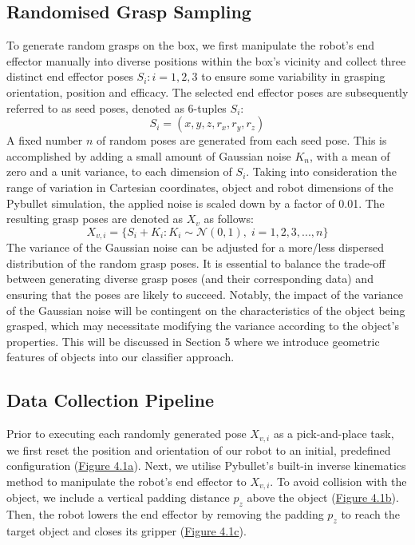 \documentclass[11pt, a4paper]{report}
\begin{document}
\subsection{Randomised Grasp Sampling}\label{sec:4.2.1}
To generate random grasps on the box, we first manipulate the robot's end effector manually into diverse positions within the box's vicinity and collect three distinct end effector poses $S_i:i=1,2,3$ to ensure some variability in grasping orientation, position and efficacy. The selected end effector poses are subsequently referred to as seed poses, denoted as 6-tuples $S_i$:
\begin{equation}
    S_i=(x,y,z,r_x,r_y,r_z)
\end{equation}
A fixed number $n$ of random poses are generated from each seed pose. This is accomplished by adding a small amount of Gaussian noise $K_n$, with a mean of zero and a unit variance, to each dimension of $S_i$. Taking into consideration the range of variation in Cartesian coordinates, object and robot dimensions of the Pybullet simulation, the applied noise is scaled down by a factor of 0.01. The resulting grasp poses are denoted as $X_v$ as follows:
\begin{equation}
    X_{v,i}=\Big\{S_i+K_i:K_i\sim\mathcal{N}(0,1),\;i=1,2,3,...,n\Big\}
\end{equation}
The variance of the Gaussian noise can be adjusted for a more/less dispersed distribution of the random grasp poses. It is essential to balance the trade-off between generating diverse grasp poses (and their corresponding data) and ensuring that the poses are likely to succeed. Notably, the impact of the variance of the Gaussian noise will be contingent on the characteristics of the object being grasped, which may necessitate modifying the variance according to the object's properties. This will be discussed in Section 5 where we introduce geometric features of objects into our classifier approach.
 

\newpage
\subsection{Data Collection Pipeline}\label{sec:4.2.2}
Prior to executing each randomly generated pose $X_{v,i}$ as a pick-and-place task, we first reset the position and orientation of our robot to an initial, predefined configuration (\hyperref[fig:4.1a]{Figure 4.1a}). Next, we utilise Pybullet's built-in inverse kinematics method to manipulate the robot's end effector to $X_{v,i}$. To avoid collision with the object, we include a vertical padding distance $p_z$ above the object (\hyperref[fig:4.1b]{Figure 4.1b}). Then, the robot lowers the end effector by removing the padding $p_z$ to reach the target object and closes its gripper (\hyperref[fig:4.1c]{Figure 4.1c}).
\end{document}
